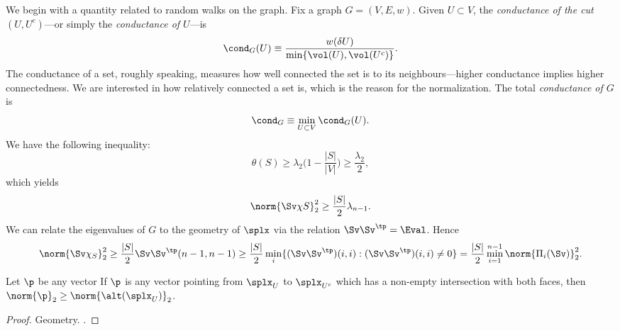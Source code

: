 We begin with a quantity related to random walks on the graph. Fix a graph $G=(V,E,w)$. Given $U\subset V$, the \emph{conductance of the cut $(U,U^c)$}---or simply the \emph{conductance of $U$}---is 
\begin{equation*}
\cond_G(U) \equiv \frac{w(\delta U)}{\min\{\vol(U),\vol(U^c)\}}.
\end{equation*}
The  conductance of a set, roughly speaking, measures how well connected the set is to its neighbours---higher conductance implies higher connectedness. We are interested in how  relatively  connected a set  is,  which is the reason for the normalization. The total \emph{conductance of $G$} is 
\begin{equation*}
\cond_G \equiv \min_{U\subset V}\cond_G(U). 
\end{equation*}
We have the following inequality: 
\[\theta(S)\geq \lambda_2\bigg(1-\frac{|S|}{|V|}\bigg)\geq \frac{\lambda_2}{2},\]
which yields 
\[\norm{\Sv \chi S}_2^2 \geq \frac{|S|}{2}\lambda_{n-1}.\]
We can relate the eigenvalues of $G$ to the geometry of $\splx$ via the relation $\Sv\Sv^\tp = \Eval$. Hence
\[\norm{\Sv \chi_S}_2^2 \geq \frac{|S|}{2} \Sv\Sv^\tp (n-1,n-1)\geq \frac{|S|}{2} \min_{i}\{(\Sv\Sv^\tp)(i,i):(\Sv\Sv^\tp)(i,i)\neq 0\} = \frac{|S|}{2}\min_{i=1}^{n-1} \norm{\Pi_i(\Sv)}_2^2.  \]


\begin{observation}
	Let $\p$ be any vector 
	If $\p$ is any vector pointing from $\splx_U$ to $\splx_{U^c}$ which has a non-empty intersection with both faces, then $\norm{\p}_2 \geq \norm{\alt(\splx_U)}_2$. 
\end{observation}
\begin{proof}
	Geometry. . 
\end{proof}

